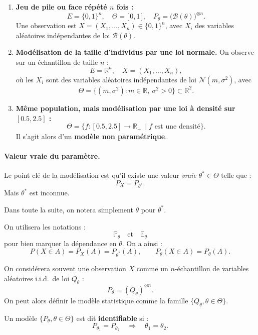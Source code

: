 \begin{exemple}
\begin{enumerate}
  \item \textbf{Jeu de pile ou face répété $n$ fois :}
  \[
  E = \{0,1\}^n, \quad 
  \Theta = \,]0,1[\,, \quad
  P_\theta = \big(\mathcal{B}(\theta)\big)^{\otimes n}.
  \]
  Une observation est $X = (X_1,\ldots,X_n) \in \{0,1\}^n$, avec $X_i$ des variables aléatoires indépendantes de loi $\mathcal{B}(\theta)$.

  \item \textbf{Modélisation de la taille d'individus par une loi normale.} On observe sur un échantillon de taille $n$ :
  \[
  E = \mathbb{R}^n, \quad X = (X_1,\ldots,X_n),
  \]
  où les $X_i$ sont des variables aléatoires indépendantes de loi $\mathcal{N}(m,\sigma^2)$, avec
  \[
  \Theta = \{ (m,\sigma^2) : m \in \mathbb{R}, \ \sigma^2 > 0 \} \subset \mathbb{R}^2.
  \]

  \item \textbf{Même population, mais modélisation par une loi à densité sur $[0.5, 2.5]$ :}
  \[
  \Theta = \{ f : [0.5,2.5] \to \mathbb{R}_+ \ \mid f \text{ est une densité} \}.
  \]
  Il s'agit alors d'un \textbf{modèle non paramétrique}.
\end{enumerate}
\end{exemple}

\paragraph{Valeur vraie du paramètre.}
Le point clé de la modélisation est qu'il existe une valeur \emph{vraie} $\theta^* \in \Theta$ telle que :
\[
P_X = P_{\theta^*}.
\]
Mais $\theta^*$ est inconnue.

Dans toute la suite, on notera simplement $\theta$ pour $\theta^*$.

On utilisera les notations :
\[
\mathbb{P}_\theta \quad \text{et} \quad \mathbb{E}_\theta
\]
pour bien marquer la dépendance en $\theta$. On a ainsi :
\[
P(X \in A) = P_X(A) = P_{\theta^*}(A), \qquad P_\theta(X \in A) = P_\theta(A).
\]

\begin{remarque}
On considérera souvent une observation $X$ comme un $n$-échantillon de variables aléatoires i.i.d.\ de loi $Q_\theta$ :
\[
P_\theta = (Q_\theta)^{\otimes n}.
\]
On peut alors définir le modèle statistique comme la famille $\{Q_\theta, \theta \in \Theta\}$.
\end{remarque}

\begin{definition}[Identifiabilité]
Un modèle $\{P_\theta, \theta \in \Theta\}$ est dit \textbf{identifiable} si :
\[
P_{\theta_1} = P_{\theta_2} \quad \Rightarrow \quad \theta_1 = \theta_2.
\]
\end{definition}

